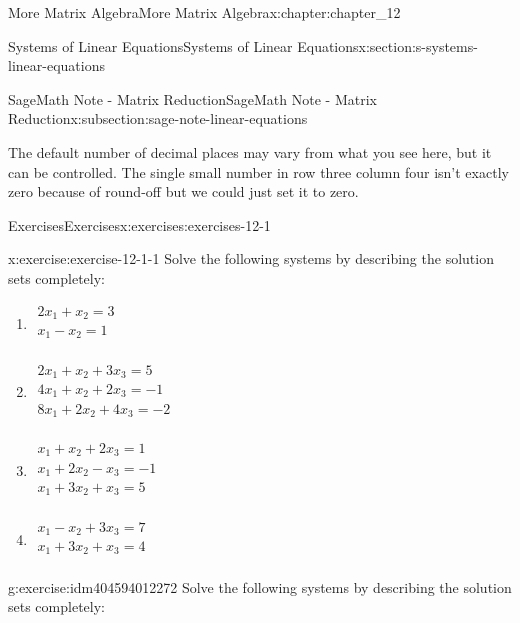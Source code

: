 \documentclass[twoside,10pt,]{book}
\numberwithin{equation}{section}
\begin{document}
\begin{chapterptx}{More Matrix Algebra}{}{More Matrix Algebra}{}{}{x:chapter:chapter_12}
\begin{sectionptx}{Systems of Linear Equations}{}{Systems of Linear Equations}{}{}{x:section:s-systems-linear-equations}
\begin{subsectionptx}{SageMath Note - Matrix Reduction}{}{SageMath Note - Matrix Reduction}{}{}{x:subsection:sage-note-linear-equations}
\begin{sageoutput}
[   0.0000000     1.000000    0.0000000    -1.500000     1.50000000000000]
[   0.0000000    0.0000000     1.000000   4.934324e-17  -1.00000000000000]
\end{sageoutput}
The default number of decimal places may vary from what you see here, but it can be controlled. The single small number in row three column four isn't exactly zero because of round-off but we could just set it to zero.%
\end{subsectionptx}
%
%
\typeout{************************************************}
\typeout{************************************************}
%
\begin{exercises-subsection}{Exercises}{}{Exercises}{}{}{x:exercises:exercises-12-1}
\begin{divisionexercise}{1}{}{}{x:exercise:exercise-12-1-1}%
Solve the following systems by describing the solution sets completely:%
\begin{multicols}{2}
\begin{enumerate}[label=(\alph*)]
\item{}\(\begin{array}{l}
2 x_1+x_2=3 \\
x_1-x_2=1 \\
\end{array}\)%
\item{}\(\begin{array}{l}
2 x_1+x_2+3 x_3=5 \\
4 x_1+x_2+2 x_3=-1 \\
8 x_1+2 x_2+4 x_3=-2 \\
\end{array}\)%
\item{}\(\begin{array}{l}
x_1+x_2+2 x_3=1 \\
x_1+2 x_2-x_3=-1 \\
x_1+3 x_2+x_3=5 \\
\end{array}\)%
\item{}\(\begin{array}{l}
x_1-x_2+3 x_3=7 \\
x_1+3 x_2+x_3=4 \\
\end{array}\)%
\end{enumerate}
\end{multicols}
%
\end{divisionexercise}%
\begin{divisionexercise}{2}{}{}{g:exercise:idm404594012272}%
Solve the following systems by describing the solution sets completely:%

\end{divisionexercise}
\end{exercises-subsection}
\end{sectionptx}
\end{chapterptx}
\end{document}
